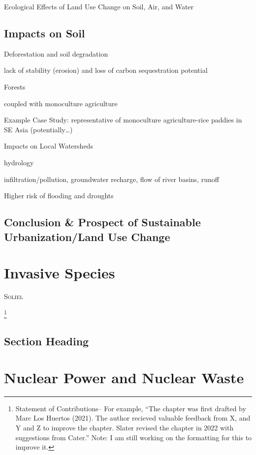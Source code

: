 \documentclass{book}\usepackage{knitr}
\makeatletter
\newcommand{\chapterauthor}[1]{%
  {\parindent0pt\vspace*{-25pt}%
  \linespread{1.1}\large\scshape#1%
  \par\nobreak\vspace*{35pt}}
  \@afterheading%
}
\makeatother
\begin{document}
Ecological Effects of Land Use Change on Soil, Air, and Water

\section{Impacts on Soil}

Deforestation and soil degradation

lack of stability (erosion) and loss of carbon sequestration potential

Forests


coupled with monoculture agriculture

Example Case Study: representative of monoculture agriculture-rice paddies in SE Asia (potentially\ldots)


Impacts on Local Watersheds

hydrology 

infiltration/pollution, groundwater recharge, flow of river basins, runoff

Higher risk of flooding and droughts

\section{Conclusion \& Prospect of Sustainable Urbanization/Land Use Change}


\chapter{Invasive Species}

\chapterauthor{Soliel}

\footnote{Statement of Contributions-- For example, ``The chapter was first drafted by Marc Los Huertos (2021). The author recieved valuable feedback from X, and Y and Z to improve the chapter. Slater revised the chapter in 2022 with suggestions from Cater.'' Note: I am still working on the formatting for this to improve it.}

\section{Section Heading}%



\chapter{Nuclear Power and Nuclear Waste}
\end{document}
